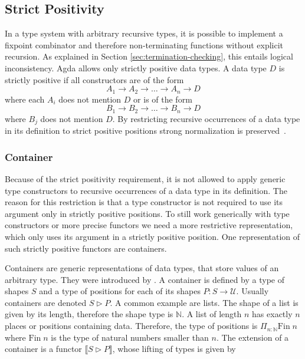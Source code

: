 \subsection{Strict Positivity}

In a type system with arbitrary recursive types, it is possible to implement a
fixpoint combinator and therefore non-terminating functions without explicit
recursion.
As explained in Section \ref{sec:termination-checking}, this entails logical
inconsistency.
Agda allows only strictly positive data types.
A data type $D$ is strictly positive if all constructors are of the form
$$
  A_1 \rightarrow A_2 \rightarrow \dots \rightarrow A_n \rightarrow D
$$
where each $A_i$ does not mention $D$ or is of the form
$$
B_1 \rightarrow B_2 \rightarrow \dots \rightarrow B_n \rightarrow D
$$
where $B_j$ does not mention $D$.
By restricting recursive occurrences of a data type in its definition to strict
positive positions strong normalization is
preserved~\cite{Wadler1991RecursiveTF}.


\subsubsection{Container}
\label{container}

Because of the strict positivity requirement, it is not allowed to apply generic
type constructors to recursive occurrences of a data type in its definition.
The reason for this restriction is that a type constructor is not required to
use its argument only in strictly positive positions.
To still work generically with type constructors or more precise functors we
need a more restrictive representation, which only uses its argument in a
strictly positive position.
One representation of such strictly positive functors are containers.

Containers are generic representations of data types, that store values of an
arbitrary type.
They were introduced by \textcite{DBLP:conf/fossacs/AbbottAG03}.
A container is defined by a type of shapes $S$ and a type of positions for each
of its shapes $P : S \rightarrow \mathcal{U}$.
Usually containers are denoted $S \rhd P$.
A common example are lists.
The shape of a list is given by its length, therefore the shape type is
$\mathbb{N}$.
A list of length $n$ has exactly $n$ places or positions containing data.
Therefore, the type of positions is $\Pi_{n : \mathbb{N}}\mathrm{Fin}\;n$ where
$\mathrm{Fin}\;n$ is the type of natural numbers smaller than $n$.
The extension of a container is a functor $\lBrack S \rhd P \rBrack $,
whose lifting of types is given by

